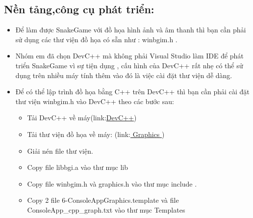 \documentclass[13pt,a4paper]{article}
\begin{document}
\subsection{Nền tảng,công cụ phát triển:}
\begin{itemize}
    \item Để làm được SnakeGame với đồ họa hình ảnh và âm thanh thì bạn cần phải sử dụng các thư viện đồ họa có sẵn như : winbgim.h .
	\item Nhóm em đã chọn DevC++ mà không phải Visual Studio làm IDE để phát triển SnakeGame vì sự tiện dụng , cấu hình của DevC++ rất nhẹ có thể sử dụng trên nhiều máy tính thêm vào đó là việc cài đặt thư viện dễ dàng.
	\item Để có thể lập trình đồ họa bằng C++ trên DevC++ thì bạn cần phải cài đặt thư viện winbgim.h vào DevC++ theo các bước sau:
	\begin{itemize}
	    \item Tải DevC++ về máy(link:\href {https://sourceforge.net/projects/embarcadero-devcpp/?fbclid=IwAR28tY1k2jzEnAbQSJlN0Q3Jg741Yeg2CxNU95PquCyH-XCROjNtL2ZfUW8} {DevC++})
	\item Tải thư viện đồ họa về máy: 
(link:\href {https://drive.google.com/file/d/1iA5XMpK5XhypoUQ5ff2jejrrzEIvomM2/view?usp=sharing} { Graphics })
\item Giải nén file thư viện.
\item Copy file libbgi.a vào thư mục lib 
\item Copy file winbgim.h và graphics.h vào thư mục include .
\item Copy 2 file 6-ConsoleAppGraphics.template và file\\ ConsoleApp\_cpp\_graph.txt vào thư mục Templates  
	\end{itemize}
\end{itemize}
\end{document}
